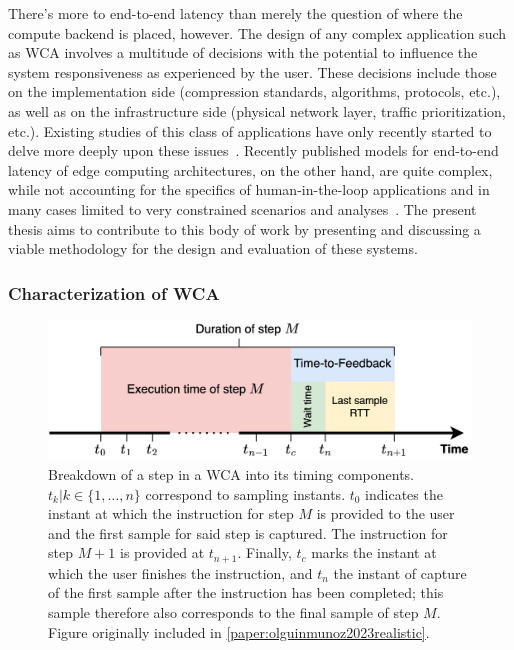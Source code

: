 There's more to end-to-end latency than merely the question of where the compute backend is placed, however.
The design of any complex application such as \gls{WCA} involves a multitude of decisions with the potential to influence the system responsiveness as experienced by the user.
These decisions include those on the implementation side (compression standards, algorithms, protocols, etc.), as well as on the infrastructure side (physical network layer, traffic prioritization, etc.).
Existing studies of this class of applications have only recently started to delve more deeply upon these issues~\cite{chen2017empirical,wang2019towards,wang2020scaling,ha2014towards,chen2015early,satyanarayanan2009case,chatzopoulos2017hyperion}.
Recently published models for end-to-end latency of edge computing architectures, on the other hand, are quite complex, while not accounting for the specifics of human-in-the-loop applications and in many cases limited to very constrained scenarios and analyses~\cite{al_zubaidy2015performance,schiessl2017finite,moothedath2022energy2,moothedath2022energy1,moothedath2021energy}.
The present thesis aims to contribute to this body of work by presenting and discussing a viable methodology for the design and evaluation of these systems.

\subsubsection{Characterization of \acs{WCA}}

\begin{figure}
    \centering
    \includegraphics[width=.9\textwidth]{publications/2023EdgeDroid2/figs/step_time}
    \caption[]{%
        Breakdown of a step in a \gls{WCA} into its timing components.
        \ensuremath{t_k | k \in \{1, \ldots, n \}} correspond to sampling instants.
        \ensuremath{t_0} indicates the instant at which the instruction for step \ensuremath{M} is provided to the user and the first sample for said step is captured.
        The instruction for step \ensuremath{M + 1} is provided at \ensuremath{t_{n+1}}.
        Finally, \ensuremath{t_c} marks the instant at which the user finishes the instruction, and \ensuremath{t_n} the instant of capture of the first sample after the instruction has been completed;
        this sample therefore also corresponds to the final sample of step \ensuremath{M}.
        Figure originally included in \cref{paper:olguinmunoz2023realistic}.
    }\label{fig:wcastep}
\end{figure}


